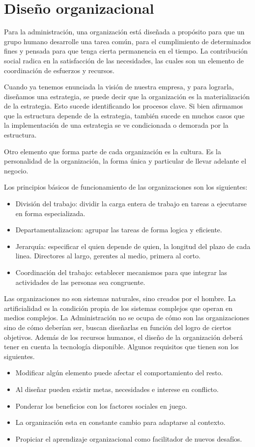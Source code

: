 \documentclass[titlepage,a4paper]{article}
\begin{document}
\section{Diseño organizacional}

Para la administración, una organización está diseñada a propósito para que un grupo humano desarrolle una tarea común, para el cumplimiento de determinados fines y pensada para que tenga cierta permanencia en el tiempo. La contribución social radica en la satisfacción de las necesidades, las cuales son un elemento de coordinación de esfuerzos y recursos.

Cuando ya tenemos enunciada la visión de nuestra empresa, y para lograrla, diseñamos una estrategia, se puede decir que la organización es la materialización de la estrategia. Esto sucede identificando los procesos clave. Si bien afirmamos que la estructura depende de la estrategia, también sucede en muchos casos que la implementación de una estrategia se ve condicionada o demorada por la estructura. 

Otro elemento que forma parte de cada organización es la cultura. Es la personalidad de la organización, la forma única y particular de llevar adelante el negocio.

Los principios básicos de funcionamiento de las organizaciones son los siguientes:
\begin{itemize}
    \item División del trabajo: dividir la carga entera de trabajo en tareas a ejecutarse en forma especializada.
    \item Departamentalizacion: agrupar las tareas de forma logica y eficiente.
    \item Jerarquía: especificar el quien depende de quien, la longitud del plazo de cada linea. Directores al largo, gerentes al medio, primera al corto.
    \item Coordinación del trabajo: establecer mecanismos para que integrar las actividades de las personas sea congruente. 
\end{itemize}

Las organizaciones no son sistemas naturales, sino creados por el hombre. La artificialidad es la condición propia de los sistemas complejos que operan en medios complejos. La Administración no se ocupa de cómo son las organizaciones sino de cómo deberían ser, buscan diseñarlas en función del logro de ciertos objetivos. Además de los recursos humanos, el diseño de la organización deberá tener en cuenta la tecnología disponible. Algunos requisitos que tienen son los siguientes.
\begin{itemize}
    \item Modificar algún elemento puede afectar el comportamiento del resto.
    \item Al diseñar pueden existir metas, necesidades e interese en conflicto.
    \item Ponderar los beneficios con los factores sociales en juego.
    \item La organización esta en constante cambio para adaptarse al contexto.
    \item Propiciar el aprendizaje organizacional como facilitador de nuevos desafíos.
\end{itemize}
\end{document}
